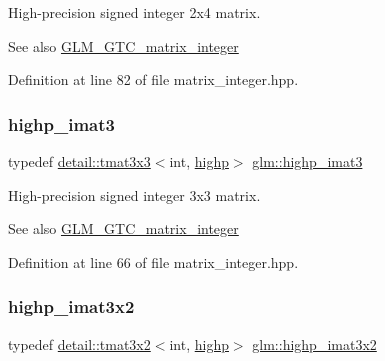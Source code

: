 High-\/precision signed integer 2x4 matrix. \begin{DoxySeeAlso}{See also}
\hyperlink{group__gtc__matrix__integer}{G\+L\+M\+\_\+\+G\+T\+C\+\_\+matrix\+\_\+integer} 
\end{DoxySeeAlso}


Definition at line 82 of file matrix\+\_\+integer.\+hpp.

\mbox{\label{group__gtc__matrix__integer_gaf12b3aa7e16a88b1fcf51be9a132048c}} 
\subsubsection{\texorpdfstring{highp\+\_\+imat3}{highp\_imat3}}
{\footnotesize\ttfamily typedef \hyperlink{structglm_1_1detail_1_1tmat3x3}{detail\+::tmat3x3}$<$int, \hyperlink{namespaceglm_a0f04f086094c747d227af4425893f545ac6f7eab42eacbb10d59a58e95e362074}{highp}$>$ \hyperlink{group__gtc__matrix__integer_gaf12b3aa7e16a88b1fcf51be9a132048c}{glm\+::highp\+\_\+imat3}}

High-\/precision signed integer 3x3 matrix. \begin{DoxySeeAlso}{See also}
\hyperlink{group__gtc__matrix__integer}{G\+L\+M\+\_\+\+G\+T\+C\+\_\+matrix\+\_\+integer} 
\end{DoxySeeAlso}


Definition at line 66 of file matrix\+\_\+integer.\+hpp.

\mbox{\label{group__gtc__matrix__integer_ga9780c1bc052a34c59dc95f4dd9e1a5c8}} 
\subsubsection{\texorpdfstring{highp\+\_\+imat3x2}{highp\_imat3x2}}
{\footnotesize\ttfamily typedef \hyperlink{structglm_1_1detail_1_1tmat3x2}{detail\+::tmat3x2}$<$int, \hyperlink{namespaceglm_a0f04f086094c747d227af4425893f545ac6f7eab42eacbb10d59a58e95e362074}{highp}$>$ \hyperlink{group__gtc__matrix__integer_ga9780c1bc052a34c59dc95f4dd9e1a5c8}{glm\+::highp\+\_\+imat3x2}}

